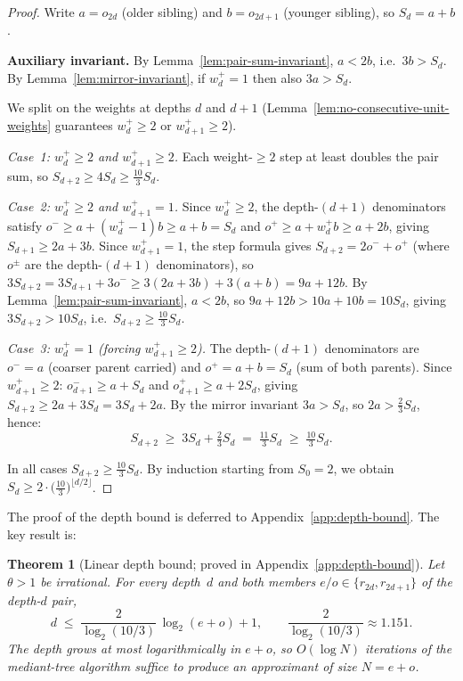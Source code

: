 \documentclass[12pt]{article}
\newtheorem{theorem}{Theorem}[section]
\theoremstyle{definition}
\theoremstyle{remark}
\theoremstyle{plain}
\begin{document}
\begin{proof}
Write $a = o_{2d}$ (older sibling) and $b = o_{2d+1}$ (younger sibling),
so $S_d = a + b$.

\textbf{Auxiliary invariant.}
By Lemma~\ref{lem:pair-sum-invariant}, $a < 2b$, i.e.\ $3b > S_d$.
By Lemma~\ref{lem:mirror-invariant}, if $w^+_d = 1$ then also $3a > S_d$.

We split on the weights at depths $d$ and $d+1$
(Lemma~\ref{lem:no-consecutive-unit-weights} guarantees $w^+_d \geq 2$ or
$w^+_{d+1} \geq 2$).

\textit{Case~1: $w^+_d \geq 2$ and $w^+_{d+1} \geq 2$.}
Each weight-${\geq}2$ step at least doubles the pair sum, so
$S_{d+2} \geq 4S_d \geq \tfrac{10}{3}S_d$.

\textit{Case~2: $w^+_d \geq 2$ and $w^+_{d+1} = 1$.}
Since $w^+_d \geq 2$, the depth-$(d+1)$ denominators satisfy
$o^- \geq a + (w^+_d-1)b \geq a+b = S_d$ and $o^+ \geq a + w^+_d b \geq a+2b$,
giving $S_{d+1} \geq 2a+3b$.
Since $w^+_{d+1} = 1$, the step formula gives
$S_{d+2} = 2o^- + o^+$ (where $o^\pm$ are the depth-$(d+1)$ denominators),
so $3S_{d+2} = 3S_{d+1} + 3o^- \geq 3(2a+3b) + 3(a+b) = 9a+12b$.
By Lemma~\ref{lem:pair-sum-invariant}, $a < 2b$, so $9a+12b > 10a+10b = 10S_d$,
giving $3S_{d+2} > 10S_d$, i.e.\ $S_{d+2} \geq \tfrac{10}{3}S_d$.

\textit{Case~3: $w^+_d = 1$ (forcing $w^+_{d+1} \geq 2$).}
The depth-$(d+1)$ denominators are $o^- = a$ (coarser parent carried) and
$o^+ = a+b = S_d$ (sum of both parents).
Since $w^+_{d+1} \geq 2$:
$o^-_{d+1} \geq a + S_d$ and $o^+_{d+1} \geq a + 2S_d$, giving
$S_{d+2} \geq 2a + 3S_d = 3S_d + 2a$.
By the mirror invariant $3a > S_d$, so $2a > \tfrac{2}{3}S_d$, hence:
\[
  S_{d+2} \;\geq\; 3S_d + \tfrac{2}{3}S_d \;=\; \tfrac{11}{3}S_d
  \;\geq\; \tfrac{10}{3}S_d.
\]

In all cases $S_{d+2} \geq \tfrac{10}{3}S_d$.
By induction starting from $S_0 = 2$, we obtain
$S_d \geq 2\cdot\bigl(\tfrac{10}{3}\bigr)^{\lfloor d/2\rfloor}$.
\end{proof}

The proof of the depth bound is deferred to Appendix~\ref{app:depth-bound}.
The key result is:

\begin{theorem}[Linear depth bound; proved in Appendix~\ref{app:depth-bound}]
\label{thm:linear-depth}
Let $\theta > 1$ be irrational.  For every depth~$d$ and both members
$e/o \in \{r_{2d}, r_{2d+1}\}$ of the depth-$d$ pair,
\[
  d \;\leq\; \frac{2}{\log_2(10/3)}\,\log_2(e + o) + 1,
  \qquad \frac{2}{\log_2(10/3)} \approx 1.151.
\]
The depth grows at most logarithmically in $e + o$, so $O(\log N)$ iterations
of the mediant-tree algorithm suffice to produce an approximant of size $N = e + o$.
\end{theorem}
\end{document}
